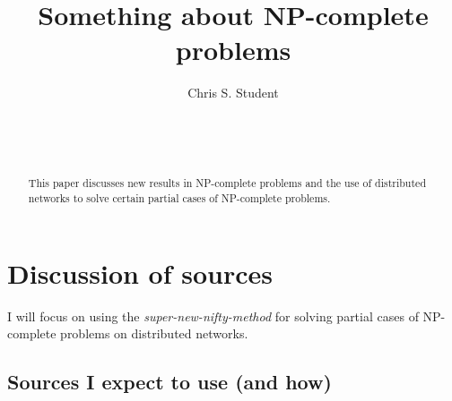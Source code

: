 \documentclass{sig-alternate}
\begin{document}

\title{Something about NP-complete problems}


\author{
\alignauthor
Chris S. Student\\
	\\
	\\
	\\
}

\maketitle

\begin{abstract}
This paper discusses new results in NP-complete problems and the use of distributed
networks to solve certain partial cases of NP-complete problems.
\end{abstract}

\section{Discussion of sources}

I will focus on using the \emph{super-new-nifty-method} for solving partial cases of
NP-complete problems on distributed networks.

\subsection{Sources I expect to use (and how)}
\end{document}
